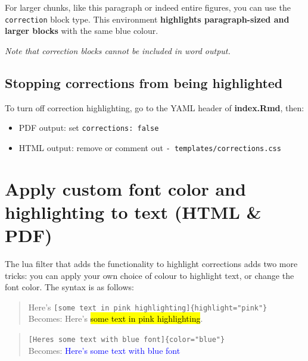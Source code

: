 \documentclass[a4paper, nobind]{templates/ociamthesis}
\providecommand{\tightlist}{%
  \setlength{\itemsep}{0pt}\setlength{\parskip}{0pt}}
\begin{document}
\begin{correction}
For larger chunks, like this paragraph or indeed entire figures, you can
use the \texttt{correction} block type. This environment
\textbf{highlights paragraph-sized and larger blocks} with the same blue
colour.
\end{correction}

\emph{Note that correction blocks cannot be included in word output.}

\hypertarget{stopping-corrections-from-being-highlighted}{%
\subsection{Stopping corrections from being highlighted}\label{stopping-corrections-from-being-highlighted}}

To turn off correction highlighting, go to the YAML header of \textbf{index.Rmd}, then:

\begin{itemize}
\tightlist
\item
  PDF output: set \texttt{corrections:\ false}\\
\item
  HTML output: remove or comment out \texttt{-\ templates/corrections.css}
\end{itemize}

\hypertarget{apply-custom-font-color-and-highlighting-to-text-html-pdf}{%
\section{Apply custom font color and highlighting to text (HTML \& PDF)}\label{apply-custom-font-color-and-highlighting-to-text-html-pdf}}

The lua filter that adds the functionality to highlight corrections adds two more tricks:
you can apply your own choice of colour to highlight text, or change the font color.
The syntax is as follows:

\begin{quote}
Here's \texttt{{[}some\ text\ in\ pink\ highlighting{]}\{highlight="pink"\}}\\
Becomes: Here's \hl{some text in pink highlighting}.
\end{quote}

\begin{quote}
\texttt{{[}Here\textquotesingle{}s\ some\ text\ with\ blue\ font{]}\{color="blue"\}}~\\
Becomes: \textcolor{blue}{Here's some text with blue font}
\end{quote}
\end{document}
